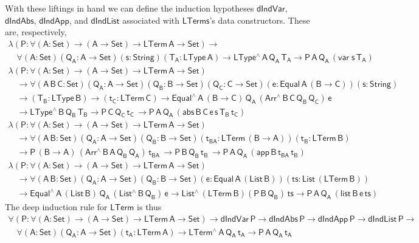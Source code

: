 \documentclass[9pt]{entcs}
\begin{document}
With these liftings in hand we can define the induction hypotheses
$\mathsf{dIndVar}$, $\mathsf{dIndAbs}$, $\mathsf{dIndApp}$, and
$\mathsf{dIndList}$ associated with $\mathsf{LTerms}$'s data
constructors. These are, respectively,
\[\begin{array}{l}
\mathsf{\lambda (P : \forall (A : Set) \to (A \to Set) \to
  LTerm\,A  \to Set) \to}\\
  \quad\mathsf{\forall (A : Set) (Q_A : A \to Set) (s : String) (T_A :
  LType\, A) \to LType^{\wedge} \, A\, Q_A\, T_A \to P \, A\, Q_A\,
  (var \; s\, T_A)}\\[1ex]
\mathsf{\lambda (P : \forall (A : Set) \to (A \to Set) \to
  LTerm\,A \to Set)} \\ 
  \quad\mathsf{\to 
  \forall (A\,B\,C: Set) (Q_A : A \to Set)  (Q_B : B \to Set) (Q_C : C
  \to Set) (e : Equal\, A\, (B \to C)) (s : String) } \\ 
  \quad\mathsf{ \to (T_B : LType\, B) \to (t_C : LTerm\, C)
  \to Equal^{\wedge}\,A\,(B \to C)\, Q_A \, (Arr^{\wedge} \, B\, C\,
  Q_B \, Q_C) \, e } \\
  \quad\mathsf{
  \to LType^{\wedge}\, B\, Q_B\, T_B
  \to P\, C\, Q_C\, t_C\, 
  \to P \, A\, Q_A\, (abs \,B \,C \, e \,s \,T_B \, t_C)
  }\\[1ex]
  \mathsf{\lambda (P : \forall (A : Set) \to (A \to Set) \to LTerm\,A
    \to Set)} \\ 
  \quad \mathsf{\to 
  \forall (A \,B : Set) (Q_A : A \to Set)  (Q_B : B \to Set) 
   (t_{BA} : LTerm\, (B \to A)) (t_B : LTerm\, B)} \\
  \quad \mathsf{
  \to P\, (B \to A)\, (Arr^{\wedge} \, B\, A\, Q_B \, Q_A) \, t_{BA} \, 
  \to P\, B\, Q_B\, t_B\, 
  \to P \, A\, Q_A\, (app \,B \,t_{BA} \, t_B) }\\[1ex]
  \mathsf{\lambda (P : \forall (A : Set) \to (A \to Set) \to LTerm\,A
    \to Set)} \\ 
  \quad \mathsf{\to 
  \forall (A \,B : Set) (Q_A : A \to Set)  (Q_B : B \to Set) 
    (e : Equal\, A\, (List\, B)) (ts : List\, (LTerm\, B))} \\ 
  \quad \mathsf{
    \to Equal^{\wedge}\, A\, (List\,B)\, Q_A\, (List^{\wedge}\, B\, Q_B)\, e 
  \to List^{\wedge}\, (LTerm\,B) (P\, B\, Q_B)\, ts
  \to P \, A\, Q_A\, (list \,B \,e \, ts) }
\end{array}\]
The deep induction rule for $\mathsf{LTerm}$ is thus
\begin{equation}\label{eq:ind-lam}
\begin{array}{l}
\mathsf{\forall (P : \forall (A : Set) \to (A \to Set) \to LTerm\,A
  \to Set) \to dIndVar\,P \to dIndAbs\,P \to dIndApp\,P \to
  dIndList\,P \to} \\ \quad \mathsf{\forall (A : Set)(Q_A : A \to
  Set)(t_A : LTerm\,A) \to LTerm^{\wedge}\,A\,Q_A\,t_A \to
  P\,A\,Q_A\,t_A}
\end{array}
\end{equation}
\end{document}
